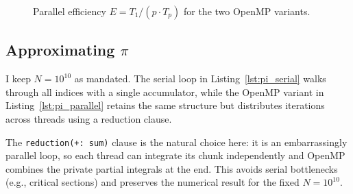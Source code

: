 \begin{figure}[H]
    \centering
    \caption{Parallel efficiency $E = T_1 / (p \cdot T_p)$ for the two OpenMP variants.}
    \label{fig:dotprod_eff}
\end{figure}

\newpage

\subsection*{Approximating $\pi$}

I keep $N = 10^{10}$ as mandated. The serial loop in Listing~\ref{lst:pi_serial} walks through all indices with a single accumulator, while the OpenMP variant in Listing~\ref{lst:pi_parallel} retains the same structure but distributes iterations across threads using a reduction clause.





The \texttt{reduction(+:\,sum)} clause is the natural choice here: it is an embarrassingly parallel loop, so each thread can integrate its chunk independently and OpenMP combines the private partial integrals at the end. This avoids serial bottlenecks (e.g., critical sections) and preserves the numerical result for the fixed $N = 10^{10}$.

